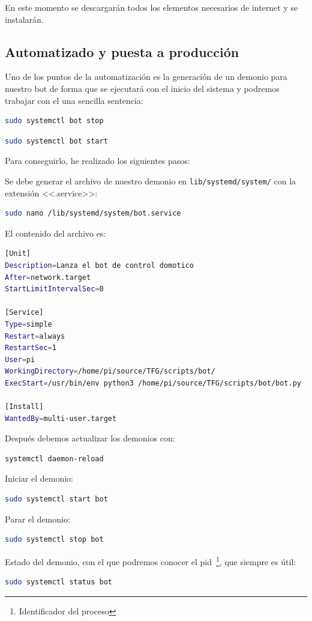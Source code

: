 En este momento se descargarán todos los elementos necesarios de internet y se instalarán.

\subsection{Automatizado y puesta a producción}
Uno de los puntos de la automatización es la generación de un demonio para nuestro bot de forma que se ejecutará con el inicio del sistema y podremos trabajar con el una sencilla sentencia:

\begin{lstlisting}[language=sh,firstnumber=0, caption={Comando que para el servicio del bot.}]
sudo systemctl bot stop
\end{lstlisting}
\begin{lstlisting}[language=sh, caption={Comando que inicia el servicio del bot.}]
sudo systemctl bot start 
\end{lstlisting}
Para conseguirlo, he realizado los siguientes pasos:

Se debe generar el archivo de nuestro demonio en \texttt{lib/systemd/system/} con la extensión <<.service>>:
\begin{lstlisting}[language=sh, firstnumber=0, caption={Archivo a modificar para generar el demonio.}]
sudo nano /lib/systemd/system/bot.service
\end{lstlisting}
El contenido del archivo es:
\begin{lstlisting}[language=sh, caption={Modificaciones en el archivo /lib/systemd/system/bot.service.}, firstnumber=0]
[Unit]
Description=Lanza el bot de control domotico
After=network.target
StartLimitIntervalSec=0

[Service]
Type=simple
Restart=always
RestartSec=1
User=pi
WorkingDirectory=/home/pi/source/TFG/scripts/bot/
ExecStart=/usr/bin/env python3 /home/pi/source/TFG/scripts/bot/bot.py

[Install]
WantedBy=multi-user.target
\end{lstlisting}
Después debemos actualizar los demonios con: 
\begin{lstlisting}[language=sh, firstnumber=0, caption={Código para actualizar los demonios.}]
systemctl daemon-reload
\end{lstlisting}
Iniciar el demonio: 
\begin{lstlisting}[language=sh, firstnumber=0, caption={Código para iniciar el demonio.}]
sudo systemctl start bot
\end{lstlisting}
Parar el demonio: 
\begin{lstlisting}[language=sh, firstnumber=0]
sudo systemctl stop bot
\end{lstlisting}
Estado del demonio, con el que podremos conocer el pid~\footnote{Identificador del proceso}, que siempre es útil: 
\begin{lstlisting}[language=sh, firstnumber=0]
sudo systemctl status bot
\end{lstlisting}

